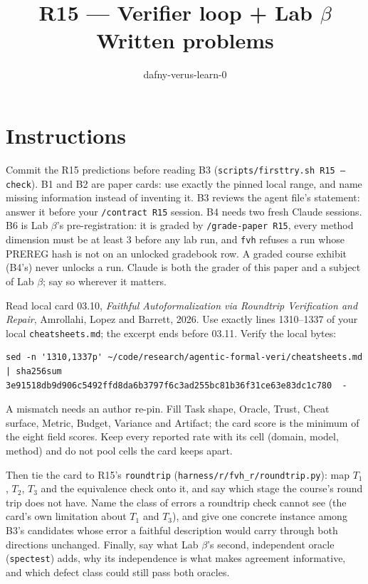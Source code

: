 \documentclass[11pt]{article}
\title{R15 --- Verifier loop + Lab $\beta$ \\ \large Written problems}
\author{dafny-verus-learn-0}
\date{}
\begin{document}
\maketitle
\sloppy
\section*{Instructions}
Commit the R15 predictions before reading B3 (\texttt{scripts/firsttry.sh R15
--check}). B1 and B2 are paper cards: use exactly the pinned local range, and
name missing information instead of inventing it. B3 reviews the agent file's
statement: answer it before your \texttt{/contract R15} session. B4 needs two fresh Claude sessions. B6 is Lab
$\beta$'s pre-registration: it is graded by \texttt{/grade-paper R15}, every
method dimension must be at least 3 before any lab run, and \texttt{fvh}
refuses a run whose PREREG hash is not on an unlocked gradebook row. A graded
course exhibit (B4's) never unlocks a run. Claude is both the grader of this
paper and a subject of Lab $\beta$; say so wherever it matters.

\begin{problem}\label{prob:B1}
Read local card 03.10, \emph{Faithful Autoformalization via Roundtrip
Verification and Repair}, Amrollahi, Lopez and Barrett, 2026. Use exactly
lines 1310--1337 of your local \texttt{cheatsheets.md}; the excerpt ends before
03.11. Verify the local bytes:
\begin{verbatim}
sed -n '1310,1337p' ~/code/research/agentic-formal-veri/cheatsheets.md | sha256sum
3e91518db9d906c5492ffd8da6b3797f6c3ad255bc81b36f31ce63e83dc1c780  -
\end{verbatim}
A mismatch needs an author re-pin. Fill Task shape, Oracle, Trust, Cheat
surface, Metric, Budget, Variance and Artifact; the card score is the minimum
of the eight field scores. Keep every reported rate with its cell (domain,
model, method) and do not pool cells the card keeps apart.

Then tie the card to R15's \texttt{roundtrip} (\texttt{harness/r/fvh\_r/roundtrip.py}):
map $T_1$, $T_2$, $T_3$ and the equivalence check onto it, and say which stage
the course's round trip does not have. Name the class of errors a roundtrip
check cannot see (the card's own limitation about $T_1$ and $T_3$), and give one
concrete instance among B3's candidates whose error a faithful description
would carry through both directions unchanged. Finally, say what Lab $\beta$'s
second, independent oracle (\texttt{spectest}) adds, why its independence is
what makes agreement informative, and which defect class could still pass
both oracles.
\end{problem}
\end{document}

